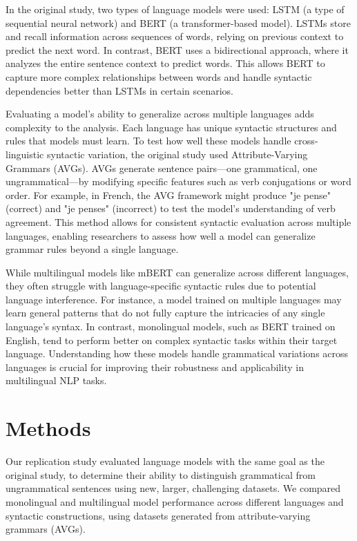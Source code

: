 \documentclass[11pt]{article}
\begin{document}
In the original study, two types of language models were used: LSTM (a type of sequential neural network) and BERT (a transformer-based model). LSTMs store and recall information across sequences of words, relying on previous context to predict the next word. In contrast, BERT uses a bidirectional approach, where it analyzes the entire sentence context to predict words. This allows BERT to capture more complex relationships between words and handle syntactic dependencies better than LSTMs in certain scenarios.

Evaluating a model's ability to generalize across multiple languages adds complexity to the analysis. Each language has unique syntactic structures and rules that models must learn. To test how well these models handle cross-linguistic syntactic variation, the original study used Attribute-Varying Grammars (AVGs). AVGs generate sentence pairs—one grammatical, one ungrammatical—by modifying specific features such as verb conjugations or word order. For example, in French, the AVG framework might produce "je pense" (correct) and "je penses" (incorrect) to test the model's understanding of verb agreement. This method allows for consistent syntactic evaluation across multiple languages, enabling researchers to assess how well a model can generalize grammar rules beyond a single language.

While multilingual models like mBERT can generalize across different languages, they often struggle with language-specific syntactic rules due to potential language interference. For instance, a model trained on multiple languages may learn general patterns that do not fully capture the intricacies of any single language's syntax. In contrast, monolingual models, such as BERT trained on English, tend to perform better on complex syntactic tasks within their target language. Understanding how these models handle grammatical variations across languages is crucial for improving their robustness and applicability in multilingual NLP tasks.

\section{Methods}
Our replication study evaluated language models with the same goal as the original study, to determine their ability to distinguish grammatical from ungrammatical sentences using new, larger, challenging datasets. We compared monolingual and multilingual model performance across different languages and syntactic constructions, using datasets generated from attribute-varying grammars (AVGs).
\end{document}
